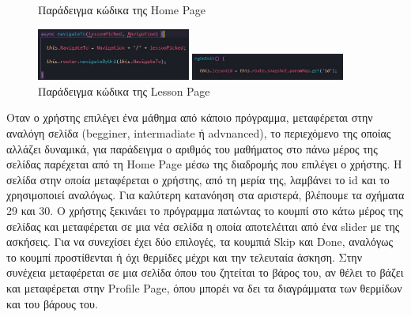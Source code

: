 \documentclass[a4paper,12pt]{article}
\begin{document}
			\begin{figure}
				\caption{Παράδειγμα κώδικα της Home Page}
				\vspace*{0.1cm}
				\includegraphics[width=0.45\textwidth]{navig}
				
				\caption{Παράδειγμα κώδικα της Lesson Page}
				\vspace*{0.1cm}
				\includegraphics[width=0.45\textwidth]{navig2}
				
			\end{figure}
			Οταν ο χρήστης επιλέγει ένα μάθημα από κάποιο πρόγραμμα, μεταφέρεται στην αναλόγη σελίδα (begginer, intermadiate ή advnanced), το περιεχόμενο της οποίας αλλάζει δυναμικά,  για παράδειγμα ο αριθμός του μαθήματος 
			στο πάνω μέρος της σελίδας παρέχεται από τη Home Page μέσω της διαδρομής που επιλέγει ο χρήστης. Η σελίδα στην οποία μεταφέρεται ο χρήστης, από τη μερία της, λαμβάνει το id
			και το χρησιμοποιεί αναλόγως. Για καλύτερη κατανόηση στα αριστερά, βλέπουμε τα σχήματα 29 και 30.
			\clearpage
			\newpage	
			Ο χρήστης ξεκινάει το πρόγραμμα πατώντας το κουμπί στο κάτω μέρος της σελίδας και μεταφέρεται σε μια νέα σελίδα η οποία αποτελέιται από ένα slider
			με της ασκήσεις. Για να συνεχίσει έχει δύο επιλογές, τα κουμπιά Skip και Done, αναλόγως το κουμπί προστίθενται ή όχι θερμίδες μέχρι και την τελευταία
			άσκηση. Στην συνέχεια μεταφέρεται σε μια σελίδα όπου του ζητείται το βάρος του, αν θέλει το βάζει και μεταφέρεται στην Profile Page, όπου μπορέι να 
			δει τα διαγράμματα των θερμίδων και του βάρους του.
			\vspace{.5cm}
\end{document}
